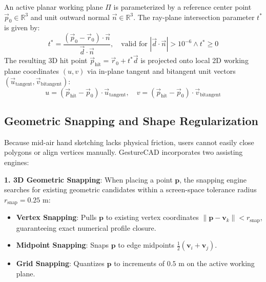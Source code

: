 An active planar working plane $\Pi$ is parameterized by a reference center point $\vec{p}_0 \in \mathbb{R}^3$ and unit outward normal $\vec{n} \in \mathbb{R}^3$. The ray-plane intersection parameter $t^*$ is given by:
\begin{equation}
t^* = \frac{(\vec{p}_0 - \vec{r}_0) \cdot \vec{n}}{\vec{d} \cdot \vec{n}}, \quad \text{valid for } |\vec{d} \cdot \vec{n}| > 10^{-6} \land t^* \ge 0
\label{eq:ray_plane_intersection}
\end{equation}
The resulting 3D hit point $\vec{p}_{\text{hit}} = \vec{r}_0 + t^* \vec{d}$ is projected onto local 2D working plane coordinates $(u, v)$ via in-plane tangent and bitangent unit vectors $(\vec{u}_{\text{tangent}}, \vec{v}_{\text{bitangent}})$:
\begin{equation}
u = (\vec{p}_{\text{hit}} - \vec{p}_0) \cdot \vec{u}_{\text{tangent}}, \quad v = (\vec{p}_{\text{hit}} - \vec{p}_0) \cdot \vec{v}_{\text{bitangent}}
\label{eq:plane_uv}
\end{equation}

\subsection{Geometric Snapping and Shape Regularization}
Because mid-air hand sketching lacks physical friction, users cannot easily close polygons or align vertices manually. GestureCAD incorporates two assisting engines:

\textbf{1. 3D Geometric Snapping}: When placing a point $\mathbf{p}$, the snapping engine searches for existing geometric candidates within a screen-space tolerance radius $r_{\text{snap}} = 0.25\text{ m}$:
\begin{itemize}
    \item \textbf{Vertex Snapping}: Pulls $\mathbf{p}$ to existing vertex coordinates $\|\mathbf{p} - \mathbf{v}_k\| < r_{\text{snap}}$, guaranteeing exact numerical profile closure.
    \item \textbf{Midpoint Snapping}: Snaps $\mathbf{p}$ to edge midpoints $\frac{1}{2}(\mathbf{v}_i + \mathbf{v}_j)$.
    \item \textbf{Grid Snapping}: Quantizes $\mathbf{p}$ to increments of $0.5\text{ m}$ on the active working plane.
\end{itemize}

